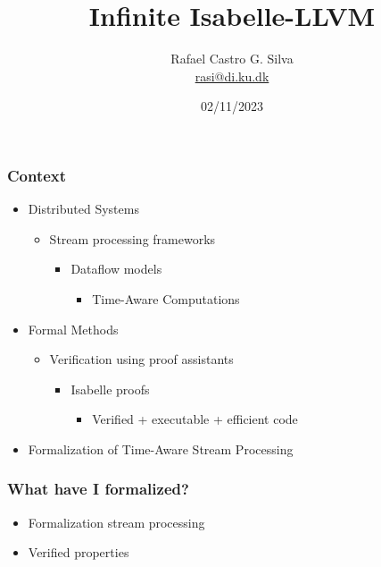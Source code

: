 \documentclass[aspectratio=169,10pt]{beamer}
\title[Verified Time-Aware Stream Processing]{Infinite Isabelle-LLVM}
\author[Rafael Castro]{
  Rafael Castro G. Silva\\\medskip
  {\small \url{rasi@di.ku.dk}}}
\date{02/11/2023}
\institute[UCPH]{
  Department of Computer Science \\
  University of Copenhagen}
\begin{document}

\begin{frame}
  \titlepage

\end{frame}

\begin{frame}[fragile]
  \frametitle{Context}
  \begin{itemize}
          \pause
    \item Distributed Systems
          \begin{itemize}
            \item Stream processing frameworks
                  \begin{itemize}
                    \item Dataflow models
                          \begin{itemize}
                            \item Time-Aware Computations
                          \end{itemize}
                  \end{itemize}
          \end{itemize}
          \pause
    \item Formal Methods
          \begin{itemize}
            \item Verification using proof assistants
                  \begin{itemize}
                    \item Isabelle proofs
                          \begin{itemize}
                            \item Verified + executable + efficient code
                          \end{itemize}
                  \end{itemize}
          \end{itemize}
    \item Formalization of Time-Aware Stream Processing
  \end{itemize}
\end{frame}

\begin{frame}[fragile]
  \frametitle{What have I formalized?}
  \begin{itemize}
          \pause
    \item Formalization stream processing
    \item Verified properties
  \end{itemize}
\end{frame}
\end{document}
